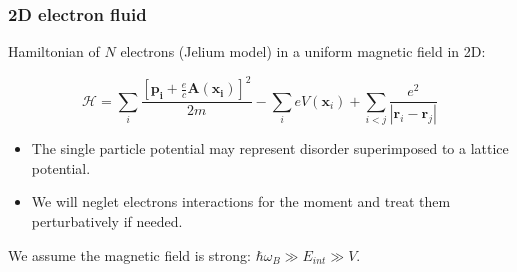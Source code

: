 \documentclass{beamer}
\begin{document}
\begin{frame}
\frametitle{2D electron fluid}
\begin{center}



Hamiltonian of $N$ electrons (Jelium model) in a uniform magnetic field in 2D:

\[
\mathcal{H} = \sum_i \frac{\left[ \mathbf{p_i} + \frac{e}{c} \mathbf{A} \left( \mathbf{x_i} \right) \right] ^2}{2 m} - \sum_i e V(\mathbf{x}_i) + \sum_{i<j} \frac{e^2}{| \mathbf{r}_i- \mathbf{r}_j|} 
\]

\begin{itemize}
\item The single particle potential may represent disorder superimposed to a lattice potential.
\item We will neglet electrons interactions for the moment and treat them perturbatively if needed.
\end{itemize}

We assume the magnetic field is strong: $\hbar \omega_B \gg E_{int} \gg V$.




\end{center}
\end{frame}
\end{document}
